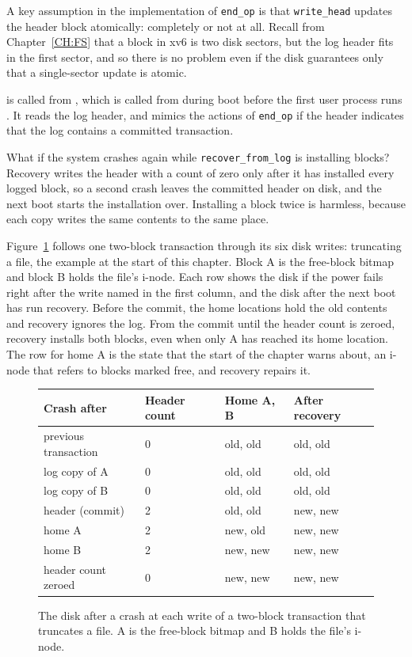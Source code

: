 A key assumption in the implementation of \lstinline{end_op} is that
\lstinline{write_head} updates the header block atomically: completely or
not at all.
Recall from Chapter~\ref{CH:FS} that a block in xv6 is two disk sectors, but the log header
fits in the first sector, and so there is no problem even if the disk
guarantees only that a single-sector update is atomic.

is called from 
,
which is called from  during boot before the first user process runs
.
It reads the log header, and mimics the actions of
\lstinline{end_op}
if the header indicates that the log contains a committed transaction.

What if the system crashes again while
\lstinline{recover_from_log}
is installing blocks?
Recovery writes the header with a count of zero only after it has
installed every logged block, so a second crash leaves the committed
header on disk, and the next boot starts the installation over.
Installing a block twice is harmless, because each copy writes the same
contents to the same place.

Figure~\ref{fig:logcrash}
follows one two-block transaction through its six disk writes:
truncating a file, the example at the start of this chapter.
Block A is the free-block bitmap and block B holds the file's i-node.
Each row shows the disk if the power fails right after the write named
in the first column, and the disk after the next boot has run recovery.
Before the commit, the home locations hold the old contents and recovery
ignores the log.
From the commit until the header count is zeroed, recovery installs both
blocks, even when only A has reached its home location.
The row for home A is the state that the start of the chapter warns
about, an i-node that refers to blocks marked free, and recovery
repairs it.

\begin{figure}[t]
\center
\begin{tabular}{llll}
{\bf Crash after} & {\bf Header count} & {\bf Home A, B} & {\bf After recovery} \\
\midrule
previous transaction & 0 & old, old & old, old \\
log copy of A & 0 & old, old & old, old \\
log copy of B & 0 & old, old & old, old \\
header (commit) & 2 & old, old & new, new \\
home A & 2 & new, old & new, new \\
home B & 2 & new, new & new, new \\
header count zeroed & 0 & new, new & new, new \\
\end{tabular}
\caption{The disk after a crash at each write of a two-block transaction
that truncates a file. A is the free-block bitmap and B holds the file's i-node.}
\label{fig:logcrash}
\end{figure}

